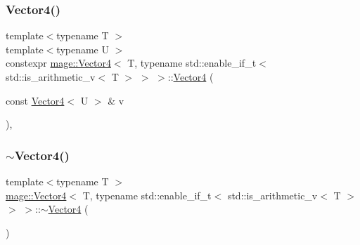 \subsubsection{\texorpdfstring{Vector4()}{Vector4()}\hspace{0.1cm}{\footnotesize\ttfamily [8/8]}}
{\footnotesize\ttfamily template$<$typename T $>$ \\
template$<$typename U $>$ \\
constexpr \hyperlink{structmage_1_1_vector4}{mage\+::\+Vector4}$<$ T, typename std\+::enable\+\_\+if\+\_\+t$<$ std\+::is\+\_\+arithmetic\+\_\+v$<$ T $>$ $>$ $>$\+::\hyperlink{structmage_1_1_vector4}{Vector4} (\begin{DoxyParamCaption}\item[{const \hyperlink{structmage_1_1_vector4}{Vector4}$<$ U $>$ \&}]{v }\end{DoxyParamCaption})\hspace{0.3cm}{\ttfamily [explicit]}, {\ttfamily [noexcept]}}

\hypertarget{structmage_1_1_vector4_3_01_t_00_01typename_01std_1_1enable__if__t_3_01std_1_1is__arithmetic__v_3_01_t_01_4_01_4_01_4_adf95cf5784bcd1e2302df8fb733caeb6}{}\label{structmage_1_1_vector4_3_01_t_00_01typename_01std_1_1enable__if__t_3_01std_1_1is__arithmetic__v_3_01_t_01_4_01_4_01_4_adf95cf5784bcd1e2302df8fb733caeb6} 
\subsubsection{\texorpdfstring{$\sim$\+Vector4()}{~Vector4()}}
{\footnotesize\ttfamily template$<$typename T $>$ \\
\hyperlink{structmage_1_1_vector4}{mage\+::\+Vector4}$<$ T, typename std\+::enable\+\_\+if\+\_\+t$<$ std\+::is\+\_\+arithmetic\+\_\+v$<$ T $>$ $>$ $>$\+::$\sim$\hyperlink{structmage_1_1_vector4}{Vector4} (\begin{DoxyParamCaption}{ }\end{DoxyParamCaption})\hspace{0.3cm}{\ttfamily [default]}}



